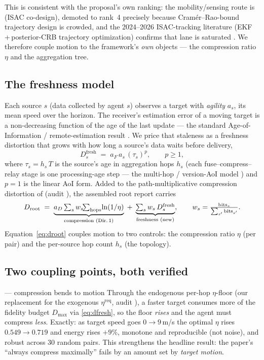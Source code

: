 This is consistent with the proposal's own ranking: the mobility/sensing route is
 (ISAC co-design), demoted to rank~4 precisely because Cram\'er--Rao-bound
trajectory design is crowded, and the 2024--2026 ISAC-tracking literature
(EKF\,+\,posterior-CRB trajectory optimization) confirms that lane is saturated
\cite{isacswarm}. We therefore couple motion to the framework's \emph{own}
objects --- the compression ratio $\eta$ and the aggregation tree.

\subsection{The freshness model}

Each source $s$ (data collected by agent $s$) observes a target with
\emph{agility} $a_s$, its mean speed over the horizon. The receiver's estimation
error of a moving target is a non-decreasing function of the age of the last
update --- the standard Age-of-Information / remote-estimation result
\cite{sun2017,aoii2020,aoi}. We price that staleness as a freshness distortion
that grows with how long a source's data waits before delivery,
\begin{equation}
D^{\mathrm{fresh}}_s \;=\; a_F\, a_s\,(\tau_s)^p,\qquad p\ge 1,
\label{eq:dfresh}
\end{equation}
where $\tau_s = h_s\,T$ is the source's age in aggregation hops $h_s$ (each
fuse--compress--relay stage is one processing-age step --- the multi-hop /
version-AoI model \cite{aosi2025}) and $p{=}1$ is the linear AoI form. Added to
the path-multiplicative compression distortion of  (audit ), the
assembled root report carries
\begin{equation}
D_{\mathrm{root}} \;=\; \underbrace{a_D\textstyle\sum_s w_s\!\!\sum_{\text{hops}}\!\ln(1/\eta)}_{\text{compression (Dir.\,1)}}
\;+\; \underbrace{\textstyle\sum_s w_s\, D^{\mathrm{fresh}}_s}_{\text{freshness (new)}},\qquad
w_s=\tfrac{\text{bits}_s}{\sum_{s'}\text{bits}_{s'}}.
\label{eq:droot}
\end{equation}
Equation~\eqref{eq:droot} couples motion to two controls: the compression ratio
$\eta$ (per pair) and the per-source hop count $h_s$ (the topology).

\subsection{Two coupling points, both verified}

\begin{ideabox}{ --- compression bends to motion}
Through the endogenous per-hop $\eta$-floor (our replacement for the exogenous
$\eta^{\mathrm{req}}$, audit ), a faster target consumes more of the
fidelity budget $D_{\max}$ via \eqref{eq:dfresh}, so the floor \emph{rises} and
the agent must compress \emph{less}. Exactly: as target speed goes $0\!\to\!9$\,m/s
the optimal $\eta$ rises $0.549\!\to\!0.719$ and energy rises $+9\%$, monotone and
reproducible (not noise), and robust across $30$ random pairs. This strengthens
the headline  result: the paper's ``always compress maximally'' fails by an
amount set by \emph{target motion}.
\end{ideabox}

